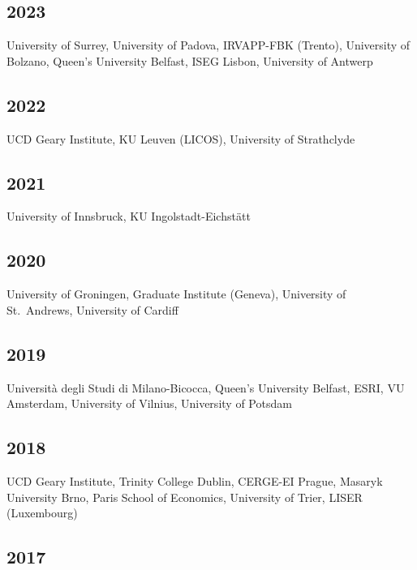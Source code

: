 \documentclass[10pt,a4paper,]{article}
\begin{document}
\hypertarget{section}{%
\subsection{2023}\label{section}}

University of Surrey, University of Padova, IRVAPP-FBK (Trento),
University of Bolzano, Queen's University Belfast, ISEG Lisbon,
University of Antwerp

\hypertarget{section-1}{%
\subsection{2022}\label{section-1}}

UCD Geary Institute, KU Leuven (LICOS), University of Strathclyde

\hypertarget{section-2}{%
\subsection{2021}\label{section-2}}

University of Innsbruck, KU Ingolstadt-Eichstätt

\hypertarget{section-3}{%
\subsection{2020}\label{section-3}}

University of Groningen, Graduate Institute (Geneva), University of
St.~Andrews, University of Cardiff

\hypertarget{section-4}{%
\subsection{2019}\label{section-4}}

Università degli Studi di Milano-Bicocca, Queen's University Belfast,
ESRI, VU Amsterdam, University of Vilnius, University of Potsdam

\hypertarget{section-5}{%
\subsection{2018}\label{section-5}}

UCD Geary Institute, Trinity College Dublin, CERGE-EI Prague, Masaryk
University Brno, Paris School of Economics, University of Trier, LISER
(Luxembourg)

\hypertarget{section-6}{%
\subsection{2017}\label{section-6}}
\end{document}
